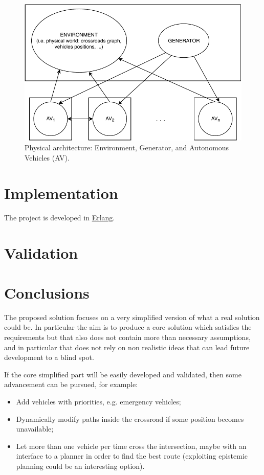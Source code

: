 \documentclass{memoir}
\begin{document}
\begin{figure}
	\centering
	\includegraphics[width=0.8\linewidth]{physical_architecture.pdf}
	\caption{Physical architecture: Environment, Generator, and Autonomous Vehicles (AV).}
	\label{fig:physical-architecture}
\end{figure}


\chapter{Implementation}
The project is developed in \href{https://www.erlang.org/}{Erlang}.

\chapter{Validation}


\chapter{Conclusions}
The proposed solution focuses on a very simplified version of what a real solution could be. In particular the aim is to produce a core solution which satisfies the requirements but that also does not contain more than necessary assumptions, and in particular that does not rely on non realistic ideas that can lead future development to a blind spot.

If the core simplified part will be easily developed and validated, then some advancement can be pursued, for example:
\begin{itemize}
	\item Add vehicles with priorities, e.g. emergency vehicles;
	\item Dynamically modify paths inside the crossroad if some position becomes unavailable;
	\item Let more than one vehicle per time cross the intersection, maybe with an interface to a planner in order to find the best route (exploiting epistemic planning could be an interesting option).
\end{itemize}



\end{document}
